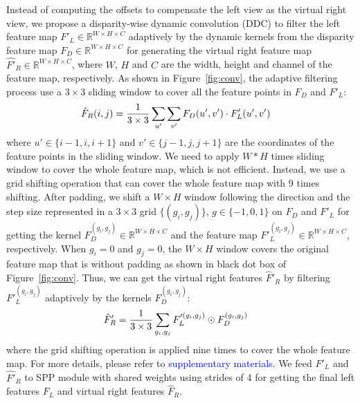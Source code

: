 \documentclass[10pt,twocolumn,letterpaper]{article}
\begin{document}
Instead of computing the offsets to compensate the left view as the virtual right view, we propose a disparity-wise dynamic convolution (DDC) to filter the left feature map $F'_L\in\mathbb{R}^{W\times H \times C}$ adaptively by the dynamic kernels from the disparity feature map $F_D\in\mathbb{R}^{W\times H \times C}$ for generating the virtual right feature map $\hat{F'}_R\in\mathbb{R}^{W\times H \times C}$, where $W$, $H$ and $C$ are the width, height and channel of the feature map, respectively. As shown in Figure~\ref{fig:conv}, the adaptive filtering process use a $3 \times 3$ sliding window to cover all the feature points in $F_D$ and $F'_L$:
\begin{eqnarray}
\vspace{-2mm}
&\hat{F}_R(i, j) =\frac{1}{3 \times 3} \sum\limits_{u'}\sum\limits_{v'}F_D(u', v') \cdot F'_L(u',v')
\vspace{-2mm}
\end{eqnarray}
where $u' \in \{i-1, i, i+1\}$ and $v' \in \{j-1, j, j+1\}$ are the coordinates of the feature points in the sliding window. We need to apply $W*H$ times sliding window to cover the whole feature map, which is not efficient. Instead, we use a grid shifting operation that can cover the whole feature map with 9 times shifting. After padding, we shift a $W \times H$ window following the direction and the step size represented in a $3\times3$ grid $\{(g_i, g_j)\}$, $g \in\{-1,0,1\}$ on $F_D$ and $F'_L$ for getting the kernel $F_D^{(g_i, g_j)} \in \mathbb{R}^{W\times H \times C}$ and the feature map  $F'^{(g_i, g_j)}_L \in \mathbb{R}^{W\times H \times C}$, respectively. When $g_i = 0$ and $g_j = 0$, the $W \times H$ window covers the original feature map that is without padding as shown in black dot box of Figure~\ref{fig:conv}. Thus, we can get the virtual right features $\hat{F}'_R$ by filtering $F'^{(g_i, g_j)}_L$ adaptively by the kernels $F_D^{(g_i, g_j)}$:
\begin{eqnarray}
\vspace{-4mm}
&\hat{F}'_R =  \frac{1}{3\times 3}\sum\limits_{g_i, g_j}F'^{(g_i, g_j)}_L \odot F_D^{(g_i, g_j)} 
\vspace{-4mm}
\end{eqnarray}
where the grid shifting operation is applied nine times to cover the whole feature map. For more details, please refer to \textcolor{blue}{supplementary materials}. We feed $F'_L$ and $\hat{F'}_R$ to SPP module with shared weights using strides of 4 for getting the final left features $F_L$ and virtual right features $\hat{F}_R$.
\end{document}
